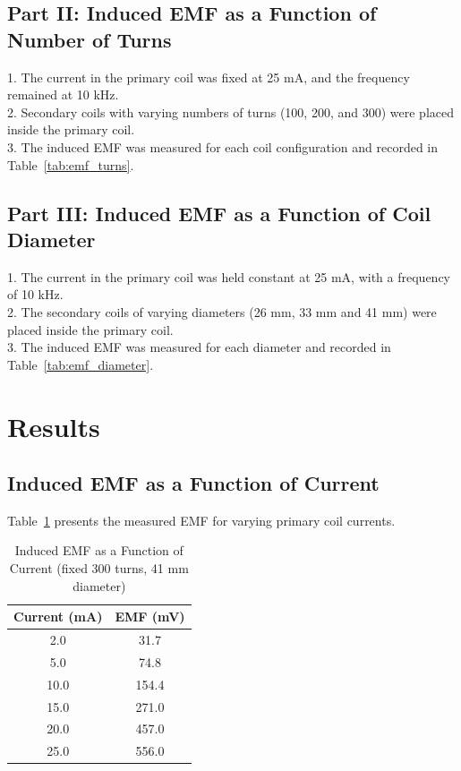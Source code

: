 \documentclass[journal]{IEEEtran}
\begin{document}
\subsection{Part II: Induced EMF as a Function of Number of Turns}
1. The current in the primary coil was fixed at 25 mA, and the frequency remained at 10 kHz.\\
2. Secondary coils with varying numbers of turns (100, 200, and 300) were placed inside the primary coil.\\
3. The induced EMF was measured for each coil configuration and recorded in Table~\ref{tab:emf_turns}.\\

\subsection{Part III: Induced EMF as a Function of Coil Diameter}
1. The current in the primary coil was held constant at 25 mA, with a frequency of 10 kHz.\\
2. The secondary coils of varying diameters (26 mm, 33 mm and 41 mm) were placed inside the primary coil.\\
3. The induced EMF was measured for each diameter and recorded in Table~\ref{tab:emf_diameter}.\\

\section{Results}
\subsection{Induced EMF as a Function of Current}
Table~\ref{tab:emf_current} presents the measured EMF for varying primary coil currents.

\begin{table}[H]
    \centering
    \caption{Induced EMF as a Function of Current (fixed 300 turns, 41 mm diameter)}
    \begin{tabular}{cc}
        \hline
        Current (mA) & EMF (mV) \\ \hline
        2.0 & 31.7 \\
        5.0 & 74.8 \\
        10.0 & 154.4 \\
        15.0 & 271.0 \\
        20.0 & 457.0 \\ 
        25.0 & 556.0 \\ \hline
    \end{tabular}
    \label{tab:emf_current}
\end{table}
\end{document}
